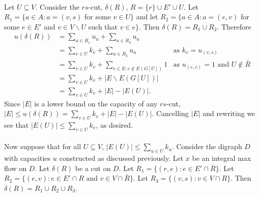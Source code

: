 \documentclass[letterpaper,12pt,oneside,onecolumn]{article}
\begin{document}
\paragraph{}
Let $U \subseteq V$. Consider the $rs$-cut, $\delta(R)$, $R = \{r\} \cup E' \cup U$. Let $R_1 = \{a \in A : a = (v,s) $ for some $v \in U\}$ and let $R_2 = \{a \in A : a = (e,v)$ for some $e \in E'$ and $v \in V\backslash U$ such that $v \in e \}$. Then $\delta(R) = R_1 \cup R_2 $. Therefore
\begin{align*}
u(\delta(R)) &= \sum_{a\in R_1} u_a + \sum_{a\in R_2} u_a \\
&= \sum_{v \in U} k_v + \sum_{a \in R_2} u_a  &\text{as $k_v = u_{(v,s)}$}\\
&= \sum_{v \in U} k_v + \sum_{e \in E : e \not\in E(G[U])} 1 &\text{as $u_{(e,v)} = 1$ and $U\not\in \bar{R}$}\\ 
&= \sum_{v \in U} k_v + |E \backslash E(G[U])| \\
&= \sum_{v \in U} k_v + |E| - |E(U)|.
\end{align*}
Since $|E|$ is a lower bound on the capacity of any $rs$-cut, $|E| \leq u(\delta(R)) = \sum_{v \in U} k_v + |E| - |E(U)|$. Cancelling $|E|$ and rewriting we see that $|E(U)| \leq \sum_{v \in U} k_v$, as desired.
\paragraph{}
Now suppose that for all $U \subseteq V$, $|E(U)| \leq \sum_{u \in U} k_u$. Consider the digraph $D$ with capacities $u$ constructed as discussed previously. Let $x$ be an integral max flow on $D$. Let $\delta(R)$ be a cut on $D$. Let $R_1 = \{ (r,e): e \in E' \cap \bar{R}\}$. Let $R_2 = \{(e,v): e \in E' \cap R \text{ and } v \in V \cap \bar{R}\}$. Let $R_3 = \{(v,s) : v \in V \cap R\}$. Then $\delta(R) = R_1 \cup R_2 \cup R_3$.
\end{document}
